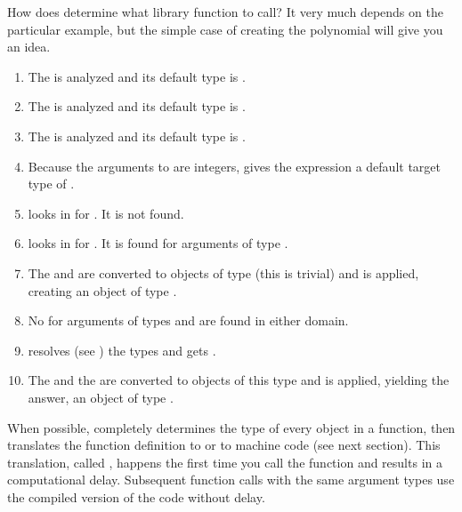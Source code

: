 How does \Language{} determine what library function to call?
It very much depends on the particular example, but the simple case of
creating the polynomial
 will give you an idea.
\begin{enumerate}
\item The  is analyzed and its default type is
.
\item The  is analyzed and its default type is
.
\item The  is analyzed and its default type is
.
\item Because the arguments to \spadop{/} are integers, \Language{}
gives the expression  a default target type of
.
\item \Language{} looks in  for \spadop{/}.
It is not found.
\item \Language{} looks in  for \spadop{/}.
It is found for arguments of type .
\item The  and  are converted to objects of type
 (this is trivial) and \spadop{/} is applied,
creating an object of type .
\item No \spadop{+} for arguments of types  and
 are found in either domain.
\item \Language{} resolves
(see )
the types and gets .
\item The  and the  are converted to objects of this
type and \spadop{+} is applied, yielding the answer, an object of type
.
\end{enumerate}


When possible, \Language{} completely determines the type of every object in
a function, then translates the function definition to \Lisp{} or
to machine code (see next section).
This translation,
called , happens the first time you call
the function and results in a computational delay.
Subsequent function calls with the same argument types use the compiled
version of the code without delay.

